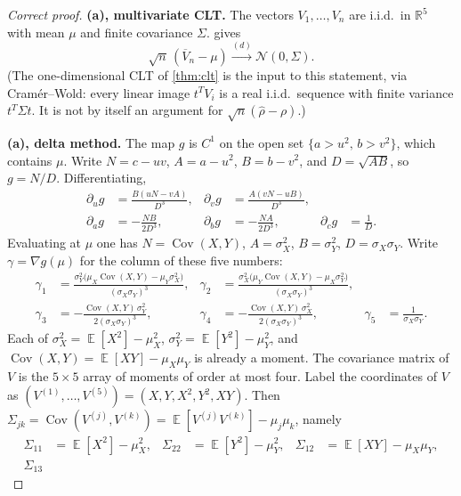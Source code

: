 \documentclass[11pt,a4paper]{article}
\DeclareMathOperator{\E}{\mathbb{E}}
\begin{document}
\begin{proof}[Correct proof]
\textbf{(a), multivariate CLT.}
The vectors \( V_1,\dots,V_n \) are i.i.d.\ in \( \mathbb{R}^{5} \) with mean \( \mu \) and finite covariance \( \Sigma \).  gives
\[
\sqrt{n}\,(\overline{V}_n-\mu)
\xrightarrow{(d)}
\mathcal{N}(0,\Sigma).
\]
(The one-dimensional CLT of \cref{thm:clt} is the input to this statement, via Cram\'er--Wold: every linear image \( t^{T}V_i \) is a real i.i.d.\ sequence with finite variance \( t^{T}\Sigma t \). It is not by itself an argument for \( \sqrt{n}(\hat{\rho}-\rho) \).)

\textbf{(a), delta method.}
The map \( g \) is \( C^{1} \) on the open set \( \{a>u^{2},\,b>v^{2}\} \), which contains \( \mu \). Write \( N=c-uv \), \( A=a-u^{2} \), \( B=b-v^{2} \), and \( D=\sqrt{AB} \), so \( g=N/D \). Differentiating,
\begin{align*}
\partial_u g
&=
\frac{B(uN-vA)}{D^{3}},
&
\partial_v g
&=
\frac{A(vN-uB)}{D^{3}},
\\
\partial_a g
&=
-\frac{NB}{2D^{3}},
&
\partial_b g
&=
-\frac{NA}{2D^{3}},
&
\partial_c g
&=
\frac{1}{D}.
\end{align*}
Evaluating at \( \mu \) one has \( N=\operatorname{Cov}(X,Y) \), \( A=\sigma_X^{2} \), \( B=\sigma_Y^{2} \), \( D=\sigma_X\sigma_Y \). Write \( \gamma=\nabla g(\mu) \) for the column of these five numbers:
\begin{align*}
\gamma_1
&=
\frac{\sigma_Y^{2}\bigl(\mu_X\operatorname{Cov}(X,Y)-\mu_Y\sigma_X^{2}\bigr)}{(\sigma_X\sigma_Y)^{3}},
&
\gamma_2
&=
\frac{\sigma_X^{2}\bigl(\mu_Y\operatorname{Cov}(X,Y)-\mu_X\sigma_Y^{2}\bigr)}{(\sigma_X\sigma_Y)^{3}},
\\
\gamma_3
&=
-\frac{\operatorname{Cov}(X,Y)\,\sigma_Y^{2}}{2(\sigma_X\sigma_Y)^{3}},
&
\gamma_4
&=
-\frac{\operatorname{Cov}(X,Y)\,\sigma_X^{2}}{2(\sigma_X\sigma_Y)^{3}},
&
\gamma_5
&=
\frac{1}{\sigma_X\sigma_Y}.
\end{align*}
Each of \( \sigma_X^{2}=\E[X^{2}]-\mu_X^{2} \), \( \sigma_Y^{2}=\E[Y^{2}]-\mu_Y^{2} \), and \( \operatorname{Cov}(X,Y)=\E[XY]-\mu_X\mu_Y \) is already a moment. The covariance matrix of \( V \) is the \( 5\times 5 \) array of moments of order at most four. Label the coordinates of \( V \) as \( (V^{(1)},\dots,V^{(5)})=(X,Y,X^{2},Y^{2},XY) \). Then \( \Sigma_{jk}=\operatorname{Cov}(V^{(j)},V^{(k)})=\E[V^{(j)}V^{(k)}]-\mu_j\mu_k \), namely
\begin{align*}
\Sigma_{11}
&=
\E[X^{2}]-\mu_X^{2},
&
\Sigma_{22}
&=
\E[Y^{2}]-\mu_Y^{2},
&
\Sigma_{12}
&=
\E[XY]-\mu_X\mu_Y,
\\
\Sigma_{13}

\end{align*}
\end{proof}
\end{document}
